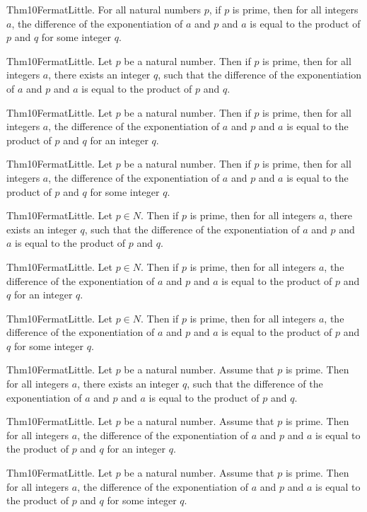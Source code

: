 \documentclass{article}
\begin{document}
Thm10FermatLittle. For all natural numbers $p$, if $p$ is prime, then for all integers $a$, the difference of the exponentiation of $a$ and $p$ and $a$ is equal to the product of $p$ and $q$ for some integer $q$.

Thm10FermatLittle. Let $p$ be a natural number. Then if $p$ is prime, then for all integers $a$, there exists an integer $q$, such that the difference of the exponentiation of $a$ and $p$ and $a$ is equal to the product of $p$ and $q$.

Thm10FermatLittle. Let $p$ be a natural number. Then if $p$ is prime, then for all integers $a$, the difference of the exponentiation of $a$ and $p$ and $a$ is equal to the product of $p$ and $q$ for an integer $q$.

Thm10FermatLittle. Let $p$ be a natural number. Then if $p$ is prime, then for all integers $a$, the difference of the exponentiation of $a$ and $p$ and $a$ is equal to the product of $p$ and $q$ for some integer $q$.

Thm10FermatLittle. Let $p \in N$. Then if $p$ is prime, then for all integers $a$, there exists an integer $q$, such that the difference of the exponentiation of $a$ and $p$ and $a$ is equal to the product of $p$ and $q$.

Thm10FermatLittle. Let $p \in N$. Then if $p$ is prime, then for all integers $a$, the difference of the exponentiation of $a$ and $p$ and $a$ is equal to the product of $p$ and $q$ for an integer $q$.

Thm10FermatLittle. Let $p \in N$. Then if $p$ is prime, then for all integers $a$, the difference of the exponentiation of $a$ and $p$ and $a$ is equal to the product of $p$ and $q$ for some integer $q$.

Thm10FermatLittle. Let $p$ be a natural number. Assume that $p$ is prime. Then for all integers $a$, there exists an integer $q$, such that the difference of the exponentiation of $a$ and $p$ and $a$ is equal to the product of $p$ and $q$.

Thm10FermatLittle. Let $p$ be a natural number. Assume that $p$ is prime. Then for all integers $a$, the difference of the exponentiation of $a$ and $p$ and $a$ is equal to the product of $p$ and $q$ for an integer $q$.

Thm10FermatLittle. Let $p$ be a natural number. Assume that $p$ is prime. Then for all integers $a$, the difference of the exponentiation of $a$ and $p$ and $a$ is equal to the product of $p$ and $q$ for some integer $q$.
\end{document}

